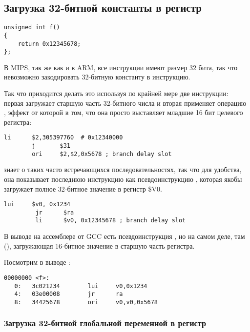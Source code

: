 ﻿\subsection{Загрузка 32-битной константы в регистр}
\label{MIPS_big_constants}

\begin{lstlisting}
unsigned int f()
{
	return 0x12345678;
};
\end{lstlisting}

В MIPS, так же как и в ARM, все инструкции имеют размер 32 бита, так что невозможно
закодировать 32-битную константу в инструкцию.

Так что приходится делать это используя по крайней мере две инструкции:
первая загружает старшую часть 32-битного числа и вторая применяет операцию ,
эффект от которой в том, что она просто выставляет младшие 16 бит целевого регистра:

\begin{lstlisting}[caption=GCC 4.4.5 -O3 (\assemblyOutput)]
        li      $2,305397760  # 0x12340000
        j       $31
        ori     $2,$2,0x5678 ; branch delay slot
\end{lstlisting}

\IDA знает о таких часто встречающихся последовательностях, так что для удобства, 
она показывает последнюю инструкцию  как псевдоинструкцию ,
которая якобы загружает полное 32-битное значение в регистр \$V0.


\begin{lstlisting}[caption=GCC 4.4.5 -O3 (IDA)]
         lui     $v0, 0x1234
         jr      $ra
         li      $v0, 0x12345678 ; branch delay slot
\end{lstlisting}

В выводе на ассемблере от GCC есть псевдоинструкция , но на самом деле, 
там  (), загружающая 16-битное значение в старшую часть регистра.

Посмотрим в выводе :

\begin{lstlisting}[caption=objdump]
00000000 <f>:
   0:   3c021234        lui     v0,0x1234
   4:   03e00008        jr      ra
   8:   34425678        ori     v0,v0,0x5678
\end{lstlisting}

\subsubsection{Загрузка 32-битной глобальной переменной в регистр}

